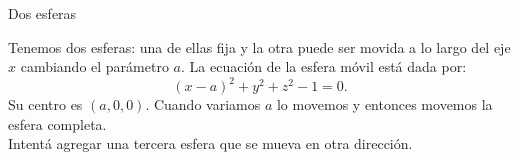 \documentclass[es]{SurferDesc}%
\begin{document}
\footnotesize
%
\begin{surferPage}
  \begin{surferTitle}Dos esferas\end{surferTitle}
   \begin{surferText}   
   
Tenemos dos esferas: una de ellas fija y la otra puede ser movida a lo largo del eje $x$ cambiando el par\'ametro $a$. La ecuaci\'on de la esfera m\'ovil est\'a dada por:
\[(x-a)^2+y^2+z^2-1=0.\]
Su centro es $(a,0,0)$. Cuando variamos $a$ lo movemos y entonces movemos la esfera completa.\\

Intent\'a agregar una tercera esfera que se mueva en otra direcci\'on.

     \end{surferText}
\end{surferPage}
\end{document}
